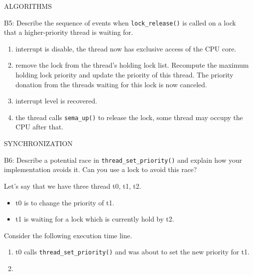 \begin{aspect}{ALGORITHMS}
	\begin{qc}
		B5: Describe the sequence of events when \lstinline{lock_release()} is called on a lock that a higher-priority thread is waiting for.
	\end{qc}

	\begin{enumerate}
		\item interrupt is disable, the thread now has exclusive access of the CPU core.
		\item remove the lock from the thread's holding lock list.
		      Recompute the maximum holding lock priority and update the priority of this thread.
		      The priority donation from the threads waiting for this lock is now canceled.
		\item interrupt level is recovered.
		\item the thread calls \lstinline{sema_up()} to release the lock, some thread may occupy the CPU after that.
	\end{enumerate}

\end{aspect}

\begin{aspect}{SYNCHRONIZATION}

	\begin{qc}
		B6: Describe a potential race in \lstinline{thread_set_priority()} and explain how your implementation avoids it.
		Can you use a lock to avoid this race?
	\end{qc}

	Let's say that we have three thread t0, t1, t2.
	\begin{itemize}
		\item t0 is to change the priority of t1.
		\item t1 is waiting for a lock which is currently hold by t2.
	\end{itemize}

	Consider the following execution time line.
	\begin{enumerate}
		\item t0 calls \lstinline{thread_set_priority()} and was about to set the new priority for t1.
		\item
	\end{enumerate}

\end{aspect}

